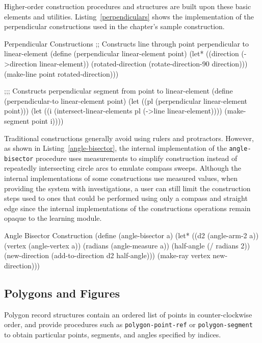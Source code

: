 Higher-order construction procedures and structures are built upon
these basic elements and utilities. Listing~\ref{perpendiculars} shows
the implementation of the perpendicular constructions used in the
chapter's sample construction.

\begin{code-listing}
[label=perpendiculars]
{Perpendicular Constructions}
;; Constructs line through point perpendicular to linear-element
(define (perpendicular linear-element point)
  (let* ((direction (->direction linear-element))
         (rotated-direction (rotate-direction-90 direction)))
    (make-line point rotated-direction)))

;;; Constructs perpendicular segment from point to linear-element
(define (perpendicular-to linear-element point)
  (let ((pl (perpendicular linear-element point)))
    (let ((i (intersect-linear-elements pl (->line linear-element))))
      (make-segment point i))))
\end{code-listing}

Traditional constructions generally avoid using rulers and
protractors. However, as shown in Listing~\ref{angle-bisector}, the
internal implementation of the \texttt{angle-bisector} procedure uses
measurements to simplify construction instead of repeatedly
intersecting circle arcs to emulate compass sweeps. Although the
internal implementations of some constructions use measured values,
when providing the system with investigations, a user can still limit
the construction steps used to ones that could be performed using only
a compass and straight edge since the internal implementations of the
constructions operations remain opaque to the learning module.

\begin{code-listing}
[label=angle-bisector]
{Angle Bisector Construction}
(define (angle-bisector a)
  (let* ((d2 (angle-arm-2 a))
         (vertex (angle-vertex a))
         (radians (angle-measure a))
         (half-angle (/ radians 2))
         (new-direction (add-to-direction d2 half-angle)))
    (make-ray vertex new-direction)))
\end{code-listing}

\subsection{Polygons and Figures}

Polygon record structures contain an ordered list of points in
counter-clockwise order, and provide procedures such as
\texttt{polygon-point-ref} or \texttt{polygon-segment} to obtain
particular points, segments, and angles specified by indices.

